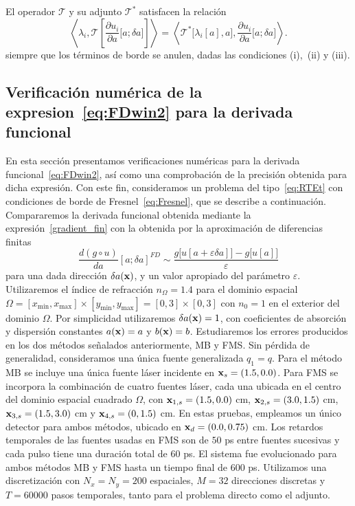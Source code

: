 El operador $\mathcal{T}$ y su adjunto $\mathcal{T}^*$ 
satisfacen la relación
\begin{equation}
\left \langle \lambda_i , 
 \mathcal{T}\left[\frac{\partial u_i}{\partial a}\big[a;\delta a\big]\right] \right \rangle=
\left \langle \mathcal{T}^* \big[\lambda_i[a],a \big] , 
 \frac{\partial u_i}{\partial a}\big[a;\delta a\big] \right \rangle.
\label{eq:RRTEdet6}
\end{equation}
siempre que los términos de borde se anulen, dadas las condiciones (i),~(ii) y (iii).


 \subsection{Verificación numérica de la expresion~\eqref{eq:FDwin2} para la derivada 
 funcional}
 \label{sec:gradcver}
 
 En esta sección presentamos verificaciones numéricas para la derivada 
 funcional~\eqref{eq:FDwin2}, así como una comprobación de la precisión 
 obtenida para dicha expresión. Con este fin, 
 consideramos un problema del tipo~\eqref{eq:RTEt} con condiciones 
 de borde de Fresnel~\eqref{eq:Fresnel}, que se describe a continuación. 
  Compararemos la derivada funcional obtenida mediante la expresión~\eqref{gradient_fin} con la obtenida por la aproximación 
 de diferencias finitas
 \begin{equation}
  \frac{d (g \circ u)}{da}[a;\delta a]^{FD} \sim
  \frac{g\big[u[a+\varepsilon \delta a]\big]
    -g\big[u[a]\big]}{\varepsilon}
\label{eq:ObjFD}
\end{equation}
para una dada dirección $\delta a(\mathbf{x})$, y un valor apropiado del parámetro $\varepsilon$. 
Utilizaremos el índice de refracción $n_{\Omega}=1.4$ para el dominio espacial $\Omega=[x_{\text{min}},x_{\text{max}}]\times[y_{\text{min}},y_{\text{max}}]=[0,3]\times[0,3]$ 
con $n_0=1$ en el exterior del dominio $\Omega$.  Por simplicidad utilizaremos $\delta a(\mathbf{x})=1$, 
con coeficientes de absorción y dispersión constantes $a(\mathbf{x})=a$ y $b(\mathbf{x})=b$. Estudiaremos los errores producidos 
en los dos métodos señalados anteriormente, MB y FMS.  
Sin pérdida de generalidad, consideramos una única fuente generalizada $q_1 = q$. 
Para el método MB se incluye una única fuente láser 
incidente en $\mathbf{x}_s=(1.5,0.0)$. Para FMS se incorpora la combinación 
de cuatro fuentes láser, cada una ubicada en el centro del dominio espacial cuadrado 
$\Omega$, con $\mathbf{x}_{1,s}=(1.5,0.0)$ cm, $\mathbf{x}_{2,s}=(3.0,1.5)$ cm, $\mathbf{x}_{3,s}=(1.5,3.0)$ cm 
y  $\mathbf{x}_{4,s}=(0,1.5)$ cm. En estas pruebas, empleamos un único 
detector para ambos métodos, ubicado en $\mathbf{x}_d=(0.0,0.75)$ cm. Los retardos 
temporales de las fuentes usadas en FMS son de $50$ ps entre fuentes sucesivas y cada pulso tiene una duración total de $60$ ps. El sistema 
 fue evolucionado para ambos métodos MB y FMS hasta un tiempo final de $600$ ps. 
 Utilizamos una discretización con $N_x=N_y=200$ espaciales, 
 $M=32$ direcciones discretas y $T=60000$ pasos temporales, tanto para el 
 problema directo como el adjunto. 
 
